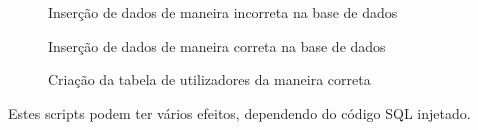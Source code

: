 \documentclass[12pt]{report}
\begin{document}
\begin{figure}[H]{
\centering
{
\caption{Inserção de dados de maneira incorreta na base de dados}
}
}\end{figure}




\begin{figure}[H]{
\centering
{
\caption{Inserção de dados de maneira correta na base de dados}
}
}\end{figure}

\begin{figure}[H]{
\centering
{
\caption{Criação da tabela de utilizadores da maneira correta}
}
}\end{figure}


Estes scripts podem ter vários efeitos, dependendo do código SQL injetado.\par
\end{document}
